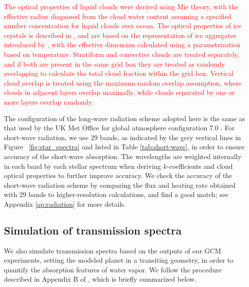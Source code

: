 \documentclass[11pt,numberedappendix,twocolappendix,]{emulateapj}
\def\wv{water vapor}
\def\addYF#1{\textcolor{red}{#1}}
\begin{document}
\addYF{The optical properties of liquid clouds were derived using Mie theory, with the effective radius diagnosed from the cloud water content assuming a specified number concentration for liquid clouds over ocean. 
The optical properties of ice crystals is described in \citet{Edwards2007}, and are based on the representation of ice aggregates introduced by \citet{Baran2001}, with the effective dimension calculated using a parametrization based on temperature.
Stratiform and convective clouds are treated separately, and if both are present in the same grid box they are treated as randomly overlapping to calculate the total cloud fraction within the grid box. 
Vertical cloud overlap is treated using the maximum-random overlap assumption, where clouds in adjacent layers overlap maximally, while clouds separated by one or more layers overlap randomly. }


The configuration of the long-wave radiation scheme adopted here is the same as that used by the UK Met Office for global atmosphere configuration 7.0 \citep[GA7.0;][]{Walters2017}. 
For short-wave radiation, we use 29 bands, as indicated by the grey vertical lines in Figure ~\ref{fig:star_spectra} and listed in Table \ref{tab:short-wave}, in order to ensure accuracy of the short-wave absorption. 
The wavelengths are weighted internally in each band by each stellar spectrum when deriving $k$-coefficients and cloud optical properties to further improve accuracy. 
We check the accuracy of the short-wave radiation scheme by comparing the flux and heating rate obtained with $29$ bands to higher-resolution calculations, and find a good match; see Appendix \ref{ap:radiation} for more details. 




\subsection{Simulation of transmission spectra}
\label{ss:method_TransmissionSpectra}

We also simulate transmission spectra based on the outputs of our GCM experiments, setting the modeled planet in a transiting geometry, in order to quantify the absorption features of \wv{}.  
We follow the procedure described in Appendix B of \citet{Way2017}, which is briefly summarized below. 
\end{document}
